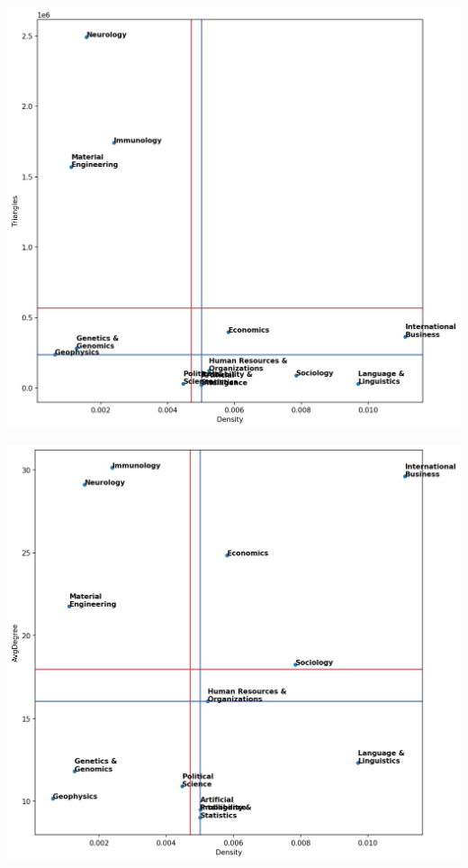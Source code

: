 \newpage

\includegraphics[width=\textwidth]{figures/all_bivariate/Density_Triangles}

\newpage

\includegraphics[width=\textwidth]{figures/all_bivariate/Density_AvgDegree}

\newpage

